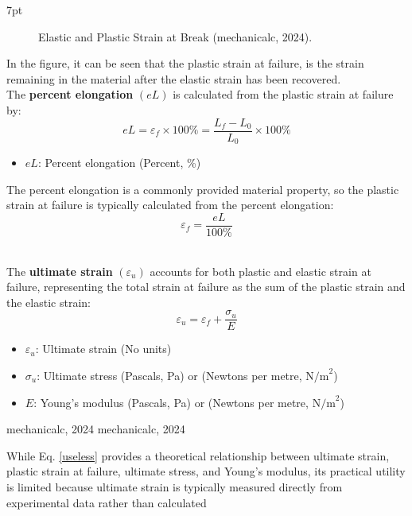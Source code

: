 \documentclass{article}
\newcommand{\formalsource}{} %
\newenvironment{formal}[1][]{%
	\renewcommand{\formalsource}{#1}%
	\def\FrameCommand{%
		\hspace{1pt}%
		{\color{gray}\vrule width 2pt}%
		{\color{white}\vrule width 4pt}%
		\colorbox{white}%
	}%
	\MakeFramed{\advance\hsize-\width\FrameRestore}%
	\noindent\hspace{-4.55pt}%
	\begin{adjustwidth}{}{7pt}%
		\vspace{2pt}%
	}%
	{%
		\vspace{4pt}%
		\ifx\formalsource\empty %
		\else
		\hfill{\footnotesize{\formalsource}}%
		\fi
	\end{adjustwidth}\endMakeFramed%
}
\begin{document}
{\begin{formal}[mechanicalc, 2024]
\begin{minipage}{0.45\textwidth}
\begin{figure}[H]
    \caption{Elastic and Plastic Strain at Break (mechanicalc, 2024).}
    \label{fig:strain-break}
\end{figure}
\end{minipage}\hfill
\begin{minipage}{0.49\textwidth}
In the figure, it can be seen that the plastic strain at failure, is the strain remaining in the material after the elastic strain has been recovered.\\[8pt]
The \textbf{percent elongation} \((eL)\) is calculated from the plastic strain at failure by:
\begin{equation}
    eL = \varepsilon_f \times 100\% = \frac{L_f - L_0}{L_0} \times 100\%
    \label{el}
\end{equation}
\begin{itemize}[itemsep=-1mm]
    \item $eL$: Percent elongation (Percent, \%)
\end{itemize}
The percent elongation is a commonly provided material property, so the plastic strain at failure is typically calculated from the percent elongation:
\begin{equation}
    \varepsilon_f = \frac{eL}{100\%}
\end{equation}
\end{minipage}\\[8pt]
The \textbf{ultimate strain} $(\varepsilon_u)$ accounts for both plastic and elastic strain at failure, representing the total strain at failure as the sum of the plastic strain and the elastic strain:
\begin{equation}
    \varepsilon_u = \varepsilon_f + \frac{\sigma_{u}}{E}
    \label{useless}
\end{equation}
\begin{itemize}[itemsep=-1mm]
    \item $\varepsilon_u$: Ultimate strain (No units)
    \item $\sigma_{u}$: Ultimate stress (Pascals, Pa) or (Newtons per metre, \(\text{N/m}^2\))
    \item $E$: Young's modulus (Pascals, Pa) or (Newtons per metre, \(\text{N/m}^2\))
\end{itemize} 
\end{formal}
\newpage
While Eq. \ref{useless} provides a theoretical relationship between ultimate strain, plastic strain at failure, ultimate stress, and Young's modulus, its practical utility is limited because ultimate strain is typically measured directly from experimental data rather than calculated\\[8pt]
}
\end{document}
